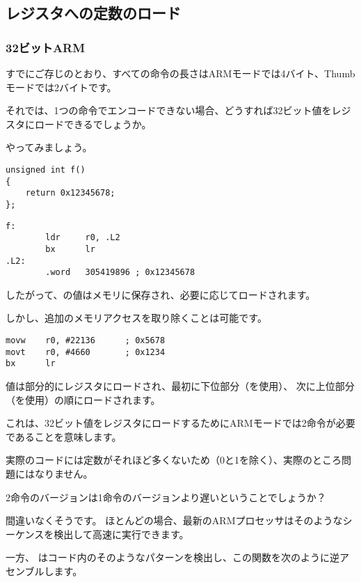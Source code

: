 ﻿\subsection{レジスタへの定数のロード}
\label{ARM_big_constants}

\subsubsection{32ビットARM}
\label{ARM_big_constants_loading}

すでにご存じのとおり、すべての命令の長さはARMモードでは4バイト、Thumbモードでは2バイトです。

それでは、1つの命令でエンコードできない場合、どうすれば32ビット値をレジスタにロードできるでしょうか。

やってみましょう。

\begin{lstlisting}[style=customc]
unsigned int f()
{
	return 0x12345678;
};
\end{lstlisting}

\begin{lstlisting}[caption=GCC 4.6.3 -O3 \ARMMode,style=customasmARM]
f:
        ldr     r0, .L2
        bx      lr
.L2:
        .word   305419896 ; 0x12345678
\end{lstlisting}

したがって、の値はメモリに保存され、必要に応じてロードされます。

しかし、追加のメモリアクセスを取り除くことは可能です。

\begin{lstlisting}[caption=GCC 4.6.3 -O3 -march{=}armv7-a (\ARMMode),style=customasmARM]
movw    r0, #22136      ; 0x5678
movt    r0, #4660       ; 0x1234
bx      lr
\end{lstlisting}

値は部分的にレジスタにロードされ、最初に下位部分（を使用）、
次に上位部分（を使用）の順にロードされます。

これは、32ビット値をレジスタにロードするためにARMモードでは2命令が必要であることを意味します。

実際のコードには定数がそれほど多くないため（0と1を除く）、実際のところ問題にはなりません。

2命令のバージョンは1命令のバージョンより遅いということでしょうか？

間違いなくそうです。 ほとんどの場合、最新のARMプロセッサはそのようなシーケンスを検出して高速に実行できます。

一方、 \IDA はコード内のそのようなパターンを検出し、この関数を次のように逆アセンブルします。

